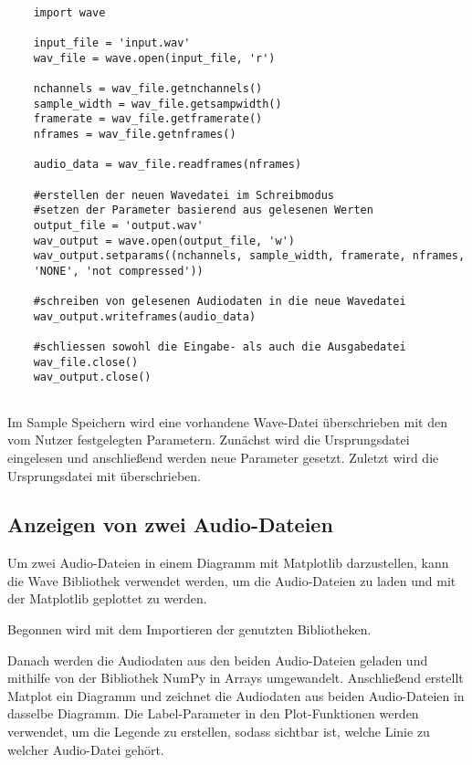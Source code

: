 \begin{verbatim}
    
    import wave 
    
    input_file = 'input.wav'
    wav_file = wave.open(input_file, 'r')
    
    nchannels = wav_file.getnchannels()
    sample_width = wav_file.getsampwidth()
    framerate = wav_file.getframerate()
    nframes = wav_file.getnframes()
    
    audio_data = wav_file.readframes(nframes)
    
    #erstellen der neuen Wavedatei im Schreibmodus 
    #setzen der Parameter basierend aus gelesenen Werten
    output_file = 'output.wav'
    wav_output = wave.open(output_file, 'w')
    wav_output.setparams((nchannels, sample_width, framerate, nframes,
    'NONE', 'not compressed'))
    
    #schreiben von gelesenen Audiodaten in die neue Wavedatei
    wav_output.writeframes(audio_data)
    
    #schliessen sowohl die Eingabe- als auch die Ausgabedatei
    wav_file.close()
    wav_output.close()
    
\end{verbatim}

Im Sample Speichern wird eine vorhandene Wave-Datei überschrieben mit den vom Nutzer festgelegten Parametern. Zunächst wird die Ursprungsdatei eingelesen und anschließend werden neue Parameter gesetzt. Zuletzt wird die Ursprungsdatei mit überschrieben.


\subsection{Anzeigen von zwei Audio-Dateien}

Um zwei Audio-Dateien in einem Diagramm mit Matplotlib darzustellen, kann die Wave Bibliothek verwendet werden, um die Audio-Dateien zu laden und mit der Matplotlib geplottet zu werden.

Begonnen wird mit dem Importieren der genutzten Bibliotheken.

Danach werden die Audiodaten aus den beiden Audio-Dateien geladen und mithilfe von der Bibliothek NumPy in Arrays umgewandelt. Anschließend erstellt Matplot ein Diagramm und zeichnet die Audiodaten aus beiden Audio-Dateien in dasselbe Diagramm. Die Label-Parameter in den Plot-Funktionen werden verwendet, um die Legende zu erstellen, sodass sichtbar ist, welche Linie zu welcher Audio-Datei gehört.

